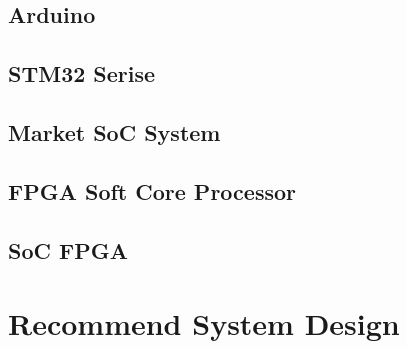 \documentclass[12pt,article]{memoir}
\begin{document}
\section{Arduino}
\section{STM32 Serise}
\section{Market SoC System}
\section{FPGA Soft Core Processor}
\section{SoC FPGA}
\newpage
\chapter{Recommend System Design}
\end{document}
